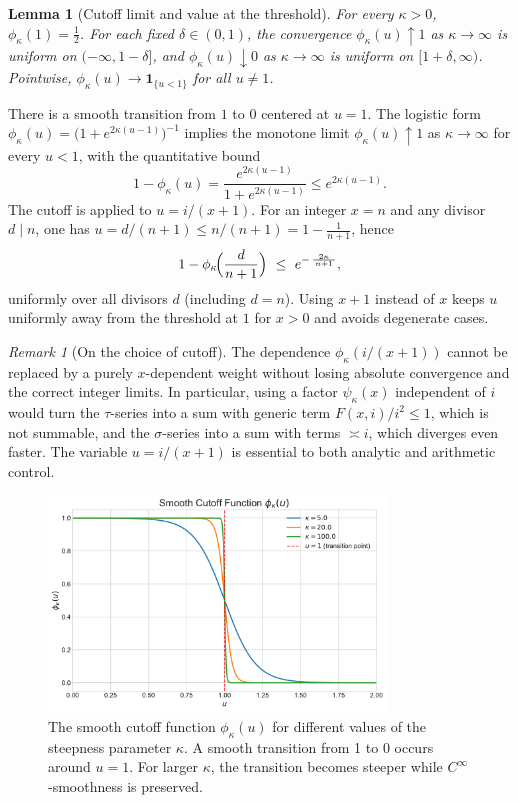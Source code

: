 \documentclass[11pt,a4paper]{amsart}
\theoremstyle{plain}
\newtheorem{lemma}[theorem]{Lemma}
\theoremstyle{definition}
\theoremstyle{remark}
\newtheorem{remark}[theorem]{Remark}
\begin{document}
\begin{lemma}[Cutoff limit and value at the threshold]
For every $\kappa>0$, $\phi_\kappa(1)=\tfrac12$. For each fixed $\delta\in(0,1)$, the convergence $\phi_\kappa(u)\uparrow 1$ as $\kappa\to\infty$ is uniform on $(-\infty,1-\delta]$, and $\phi_\kappa(u)\downarrow 0$ as $\kappa\to\infty$ is uniform on $[1+\delta,\infty)$. Pointwise, $\phi_\kappa(u)\to \mathbf 1_{\{u<1\}}$ for all $u\neq 1$.
\end{lemma}

There is a smooth transition from $1$ to $0$ centered at $u=1$.
The logistic form $\phi_\kappa(u)=\bigl(1+e^{2\kappa(u-1)}\bigr)^{-1}$ implies the monotone limit
$\phi_\kappa(u)\uparrow 1$ as $\kappa\to\infty$ for every $u<1$, with the quantitative bound
\[
1-\phi_\kappa(u)=\frac{e^{2\kappa(u-1)}}{1+e^{2\kappa(u-1)}}\le e^{2\kappa(u-1)}.
\]
The cutoff is applied to $u=i/(x+1)$. For an integer $x=n$ and any divisor $d\mid n$, one has
$u=d/(n+1)\le n/(n+1)=1-\frac{1}{n+1}$, hence
\[
1-\phi_\kappa\!\Bigl(\frac{d}{n+1}\Bigr)\ \le\ e^{-\,\frac{2\kappa}{\,n+1\,}},
\]
uniformly over all divisors $d$ (including $d=n$). Using $x+1$ instead of $x$ keeps $u$ uniformly away from the threshold at $1$ for $x>0$ and avoids degenerate cases.

\begin{remark}[On the choice of cutoff]\label{rem:cutoff-choice}
The dependence $\phi_\kappa(i/(x+1))$ cannot be replaced by a purely $x$-dependent weight without losing absolute convergence and the correct integer limits. In particular, using a factor $\psi_\kappa(x)$ independent of $i$ would turn the $\tau$-series into a sum with generic term $F(x,i)/i^2\le 1$, which is not summable, and the $\sigma$-series into a sum with terms $\asymp i$, which diverges even faster. The variable $u=i/(x+1)$ is essential to both analytic and arithmetic control.
\end{remark}

\begin{figure}[!htbp]
\centering
\includegraphics[width=0.8\textwidth]{plot_cutoff_function.pdf}
\caption{The smooth cutoff function $\phi_{\kappa}(u)$ for different values of the steepness parameter $\kappa$.
A smooth transition from 1 to 0 occurs around $u=1$.
For larger $\kappa$, the transition becomes steeper while $C^\infty$-smoothness is preserved.}
\label{fig:cutoff}
\end{figure}
\end{document}
